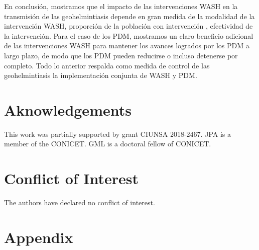 \documentclass[12pt,a4paper]{article}
\theoremstyle{plain}%
\theoremstyle{definition}
\theoremstyle{remark}
\begin{document}
	
	En conclusión, mostramos que el impacto de las intervenciones WASH en la transmisión de las geohelmintiasis depende en gran medida de la modalidad de la intervención WASH, proporción de la población con intervención , efectividad de la intervención.  
	Para el caso de los PDM, mostramos un claro beneficio adicional de las intervenciones WASH para mantener los avances logrados por los PDM a largo plazo, de modo que los PDM pueden reducirse o incluso detenerse por completo. 
	Todo lo anterior respalda como medida de control de las geohelmintiasis la
	implementación conjunta de
	WASH y PDM.
	
		
	
	
	\section*{Aknowledgements}
	
	This work was partially supported by grant CIUNSA 2018-2467. JPA is a member of the CONICET. GML is a doctoral fellow of CONICET.
	
	\section*{Conflict of Interest}
	
	The authors have declared no conflict of interest.
	
	
	
		
	
	
	\appendix
	\section{Appendix}
\end{document}
